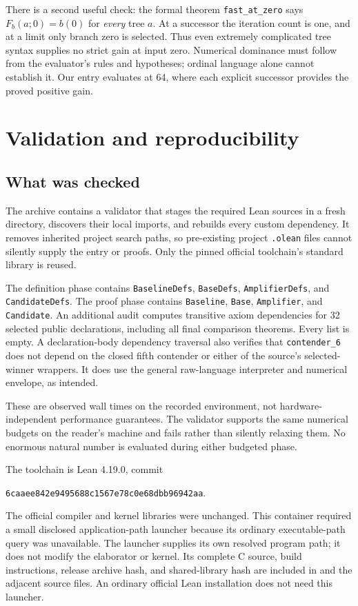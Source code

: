 \documentclass[11pt,letterpaper]{article}
\theoremstyle{definition}
\newcommand{\code}[1]{\texttt{#1}}
\newcommand{\artifact}[1]{\texttt{\detokenize{#1}}}
\begin{document}
There is a second useful check: the formal theorem \code{fast\_at\_zero}
says \(F_b(a;0)=b(0)\) for \emph{every} tree \(a\). At a successor the
iteration count is one, and at a limit only branch zero is selected. Thus even
extremely complicated tree syntax supplies no strict gain at input zero.
Numerical dominance must follow from the evaluator's rules and hypotheses;
ordinal language alone cannot establish it. Our entry evaluates at 64, where
each explicit successor provides the proved positive gain.

\section{Validation and reproducibility}
\label{sec:validation}

\subsection{What was checked}

The archive contains a validator that stages the required Lean sources in a
fresh directory, discovers their local imports, and rebuilds every custom
dependency. It removes inherited project search paths, so pre-existing project
\code{.olean} files cannot silently supply the entry or proofs. Only the pinned
official toolchain's standard library is reused.

The definition phase contains \code{BaselineDefs}, \code{BaseDefs},
\code{AmplifierDefs}, and \code{CandidateDefs}. The proof phase contains
\code{Baseline}, \code{Base}, \code{Amplifier}, and \code{Candidate}.
An additional audit computes transitive axiom dependencies for 32 selected
public declarations, including all final comparison theorems. Every list is
empty. A declaration-body dependency traversal also verifies that
\code{contender\_6} does not depend on the closed fifth contender or either
of the source's selected-winner wrappers. It does use the general raw-language
interpreter and numerical envelope, as intended.



These are observed wall times on the recorded environment, not hardware-
independent performance guarantees. The validator supports the same numerical
budgets on the reader's machine and fails rather than silently relaxing them.
No enormous natural number is evaluated during either budgeted phase.

The toolchain is Lean 4.19.0, commit
\begin{center}
\code{6caaee842e9495688c1567e78c0e68dbb96942aa}.
\end{center}
The official compiler and kernel libraries were unchanged. This container
required a small disclosed application-path launcher because its ordinary
executable-path query was unavailable. The launcher supplies its own resolved
program path; it does not modify the elaborator or kernel. Its complete C
source, build instructions, release archive hash, and shared-library hash are
included in \artifact{scripts/REPRODUCTION.md} and the adjacent source files.
An ordinary official Lean installation does not need this launcher.
\end{document}
